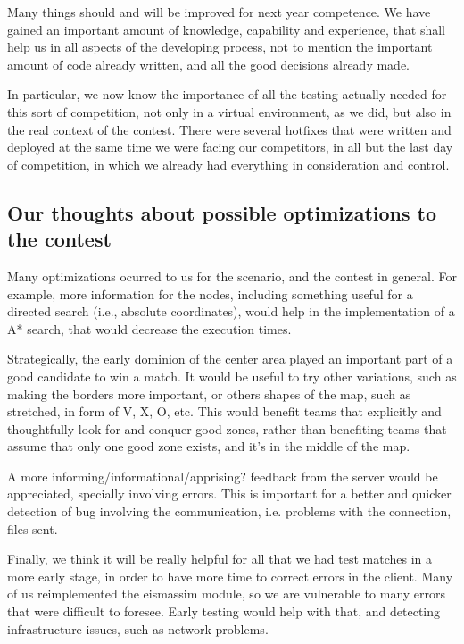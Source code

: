 \documentclass{llncs2e/llncs}
\begin{document}
    Many things should and will be improved for next year competence. We have
    gained an important amount of knowledge, capability and experience, that shall 
    help us in all aspects of the developing process, not to mention the 
    important amount of code already written, and all the good decisions already 
    made.

    In particular, we now know the importance of all the testing actually needed 
    for this sort of competition, not only in a virtual environment, as we did, 
    but also in the real context of the contest. There were several hotfixes that 
    were written and deployed at the same time we were facing our competitors, in 
    all but the last day of competition, in which we already had everything in 
    consideration and control.

\subsection{Our thoughts about possible optimizations to the contest}
    
    Many optimizations ocurred to us for the scenario, and the contest in general. 
    For example, more information for the nodes, including something useful for a 
    directed search (i.e., absolute coordinates), would help in the implementation 
    of a A* search, that would decrease the execution times.

    Strategically, the early dominion of the center area played an important part 
    of a good candidate to win a match. It would be useful to try other 
    variations, such as making the borders more important, or others shapes of the 
    map, such as stretched, in form of V, X, O, etc. This would benefit teams that 
    explicitly and thoughtfully look for and conquer good zones, rather than 
    benefiting teams that assume that only one good zone exists, and it's in the 
    middle of the map.

    A more informing/informational/apprising? feedback from the server would be 
    appreciated, specially involving errors. This is important for a better and 
    quicker detection of bug involving the communication, i.e. problems with the 
    connection, files sent.

    Finally, we think it will be really helpful for all that we had test matches 
    in a more early stage, in order to have more time to correct errors in the 
    client. Many of us reimplemented the eismassim module, so we are vulnerable to 
    many errors that were difficult to foresee. Early testing would help with 
    that, and detecting infrastructure issues, such as network problems.
    
    

    
 
 
\end{document}

